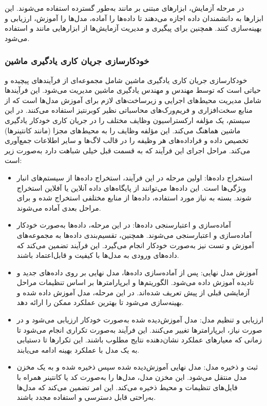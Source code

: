 در مرحله آزمایش، ابزارهای مبتنی بر  مانند  \cite{Jupyter} به‌طور گسترده استفاده می‌شوند. این ابزارها به دانشمندان داده اجازه می‌دهند تا داده‌ها را آماده، مدل‌ها را آموزش، ارزیابی و بهینه‌سازی کنند. همچنین برای پیگیری و مدیریت آزمایش‌ها از ابزارهایی مانند  و  استفاده می‌شود.

\subsubsection{خودکارسازی جریان‌ کاری یادگیری ماشین}
خودکارسازی جریان کاری یادگیری ماشین شامل مجموعه‌ای از فرآیندهای پیچیده و حیاتی است که توسط مهندس  و مهندس یادگیری ماشین مدیریت می‌شود. این فرآیندها شامل مدیریت محیط‌های اجرایی و زیرساخت‌های لازم برای آموزش مدل‌ها است که از منابع سخت‌افزاری و فریم‌ورک‌های محاسباتی نظیر کوبرنتیز استفاده می‌کنند. در این سیستم، یک مؤلفه ارکستراسیون وظایف مختلف را در جریان کاری خودکار یادگیری ماشین هماهنگ می‌کند. این مؤلفه وظایف را به محیط‌های مجزا (مانند کانتینرها) تخصیص داده و فراداده‌های هر وظیفه را در قالب لاگ‌ها و سایر اطلاعات جمع‌آوری می‌کند. مراحل اجرای این فرآیند که به قسمت قبل خیلی شباهت دارد به‌صورت زیر است:
\begin{itemize}
	\item
	استخراج داده‌ها:
	اولین مرحله در این فرآیند، استخراج داده‌ها از سیستم‌های انبار ویژگی‌ها است. این داده‌ها می‌توانند از پایگاه‌های داده آنلاین یا آفلاین استخراج شوند. بسته به نیاز مورد استفاده، داده‌ها از منابع مختلفی استخراج شده و برای مراحل بعدی آماده می‌شوند.
	\item
	آماده‌سازی و اعتبارسنجی داده‌ها:
	در این مرحله، داده‌ها به‌صورت خودکار آماده‌سازی و اعتبارسنجی می‌شوند. همچنین، تقسیم‌بندی داده‌ها به مجموعه‌های آموزش و تست نیز به‌صورت خودکار انجام می‌گیرد. این فرآیند تضمین می‌کند که داده‌های ورودی به مدل‌ها با کیفیت و قابل‌اعتماد باشند.
	\item
	آموزش مدل نهایی:
	پس از آماده‌سازی داده‌ها، مدل نهایی بر روی داده‌های جدید و نادیده آموزش داده می‌شود. الگوریتم‌ها و ابرپارامترها بر اساس تنظیمات مراحل آزمایشی قبلی از پیش تعریف شده‌اند. در این مرحله، مدل آموزش داده شده و بهینه‌سازی می‌شود تا بهترین عملکرد ممکن را ارائه دهد.
	\item
	ارزیابی و تنظیم مدل:
	مدل آموزش‌دیده شده به‌صورت خودکار ارزیابی می‌شود و در صورت نیاز، ابرپارامترها تغییر می‌کنند. این فرآیند به‌صورت تکراری انجام می‌شود تا زمانی که معیارهای عملکرد نشان‌دهنده نتایج مطلوب باشند. این تکرارها تا دستیابی به یک مدل با عملکرد بهینه ادامه می‌یابند.
	\item
	ثبت و ذخیره مدل:
	مدل نهایی آموزش‌دیده شده سپس ذخیره شده و به یک مخزن مدل منتقل می‌شود. این مخزن مدل، مدل‌ها را به‌صورت کد یا کانتینر همراه با فایل‌های تنظیمات و محیط ذخیره می‌کند. این امر تضمین می‌کند که مدل‌ها به‌راحتی قابل دسترسی و استفاده مجدد باشند.
\end{itemize}


